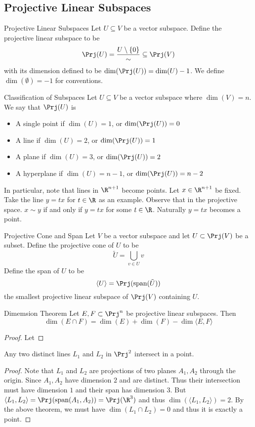 \documentclass[a4paper]{article}
\begin{document}
\subsection{Projective Linear Subspaces}
\begin{defn}{Projective Linear Subspaces}{} Let $U\subseteq V$ be a vector subspace. Define the projective linear subspace to be $$\Prj(U)=\frac{U\setminus\{0\}}{\sim}\subseteq\Prj(V)$$ with its dimension defined to be $\dim(\Prj(U))=\dim(U)-1$. We define $\dim(\emptyset)=-1$ for conventions. 
\end{defn}

\begin{defn}{Classification of Subspaces}{} Let $U\subseteq V$ be a vector subspace where $\dim(V)=n$. We say that $\Prj(U)$ is
\begin{itemize}
\item A single point if $\dim(U)=1$, or $\dim(\Prj(U))=0$
\item A line if $\dim(U)=2$, or $\dim(\Prj(U))=1$
\item A plane if $\dim(U)=3$, or $\dim(\Prj(U))=2$
\item A hyperplane if $\dim(U)=n-1$, or $\dim(\Prj(U))=n-2$
\end{itemize}
\end{defn}

In particular, note that lines in $\R^{n+1}$ become points. Let $x\in\R^{n+1}$ be fixed. Take the line $y=tx$ for $t\in\R$ as an example. Observe that in the projective space. $x\sim y$ if and only if $y=tx$ for some $t\in\R$. Naturally $y=tx$ becomes a point. 

\begin{defn}{Projective Cone and Span}{} Let $V$ be a vector subspace and let $U\subset\Prj(V)$ be a subset. Define the projective cone of $U$ to be $$\tilde{U}=\bigcup_{v\in U}v$$ Define the span of $U$ to be $$\langle U\rangle=\Prj(\text{span}(\tilde{U}))$$ the smallest projective linear subspace of $\Prj(V)$ containing $U$. 
\end{defn}

\begin{thm}{Dimemsion Theorem}{} Let $E,F\subset\Prj^n$ be projective linear subspaces. Then $$\dim(E\cap F)=\dim(E)+\dim(F)-\dim\langle E,F\rangle$$ \tcbline
\begin{proof}
Let 
\end{proof}
\end{thm}

\begin{thm}{}{} Any two distinct lines $L_1$ and $L_2$ in $\Prj^2$ intersect in a point. \tcbline
\begin{proof}
Note that $L_1$ and $L_2$ are projections of two planes $A_1,A_2$ through the origin. Since $A_1,A_2$ have dimension $2$ and are distinct. Thus their intersection must have dimension $1$ and their span has dimension $3$. But $\langle L_1,L_2\rangle=\Prj(\text{span}(A_1,A_2))=\Prj(\R^3)$ and thus $\dim(\langle L_1,L_2\rangle)=2$. By the above theorem, we must have $\dim(L_1\cap L_2)=0$ and thus it is exactly a point. 
\end{proof}
\end{thm}
\end{document}
